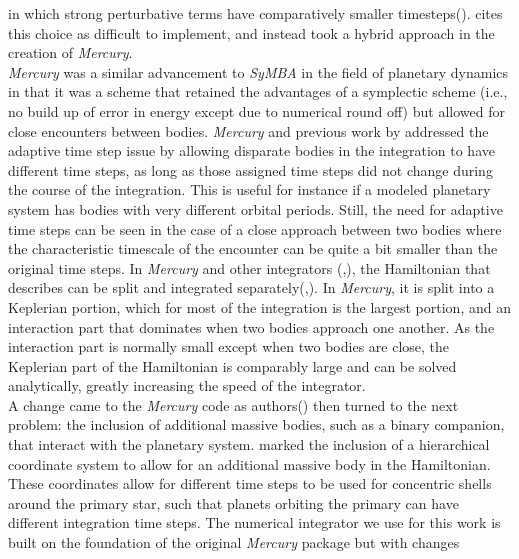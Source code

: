 \documentclass{aastex631}
\begin{document}
in which strong perturbative terms have comparatively smaller timesteps(\cite{dun98}). \cite{cha99} cites this choice as difficult to implement, and instead 
took a hybrid approach in the creation of \textit{Mercury}. \\
 \textit{Mercury} was a similar advancement to \textit{SyMBA} in the field of planetary dynamics in that it was a \cite{wis91} scheme that retained the advantages of a symplectic scheme 
(i.e., no build up of error in energy except due to numerical round off) but allowed for close encounters between bodies. \textit{Mercury} and previous work by \cite{sah94}
addressed the adaptive time step issue by allowing disparate bodies in the integration to have different time steps, as long as those assigned time steps 
did not change during the course of the integration. This is useful for instance if a modeled planetary system
has bodies with very different orbital periods.
Still, the need for adaptive time steps can be seen in the case of a close approach between
two bodies where the characteristic timescale of the encounter can be quite a bit smaller than the original time steps. 
In \textit{Mercury} and other integrators (\cite{dun98},\cite{ric00}), the Hamiltonian that describes
can be split and integrated separately(\cite{yos90},\cite{sah92}). In \textit{Mercury}, it is split into a Keplerian portion, which for most of the 
integration is the largest portion, and an interaction part that dominates when two bodies 
approach one another. As the interaction part is normally small except when two bodies are close, the Keplerian part of the Hamiltonian is comparably large and can be solved
analytically, greatly increasing the speed of the integrator. \\
\indent A change came to the \textit{Mercury} code as authors(\cite{cha02}) then turned to the next problem: the inclusion of additional massive bodies, such as a 
binary companion, that interact with the planetary system. \cite{cha02} marked the inclusion of a hierarchical coordinate system
to allow for an additional massive body in the Hamiltonian. These coordinates allow for different time steps to be used for concentric shells around the primary star,
such that planets orbiting the primary can have different integration time steps.
The numerical integrator we use for this work is built on the foundation of the original \textit{Mercury} package but with changes
\end{document}
